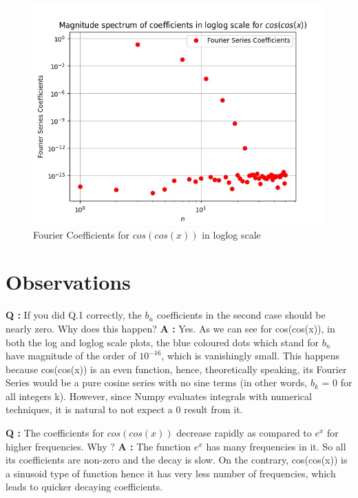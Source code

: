 \documentclass{article}
\begin{document}
\begin{figure}[!tbh]
    \centering
    \includegraphics[scale=0.65]{plots/Magnitude spectrum of coefficients in loglog scale for $cos(cos(x))$.jpg}
    \caption{Fourier Coefficients for $cos(cos(x))$ in loglog scale}
    \label{fig:Figure 6}
    \end{figure}

 
\hfill \break
\hfill \break

\section{Observations}
\textbf{Q :} If you did Q.1 correctly, the $b_n$ coefficients in the second case should be nearly zero. Why does this happen?\newline
\textbf{A :} Yes. As we can see for cos(cos(x)), in both the log and loglog scale plots, the blue coloured dots which stand for $b_n$ have magnitude of the order of $10^{-16}$, which is vanishingly small. This happens because cos(cos(x)) is an even function, hence, theoretically speaking, its Fourier Series would be a pure cosine series with no sine terms (in other words, $b_k$ = 0 for all integers k). However, since Numpy evaluates integrals with numerical techniques, it is natural to not expect a 0 result from it. \newline \newline

\noindent\textbf{Q :} The coefficients for $cos(cos(x))$ decrease rapidly as compared to $e^x$ for higher frequencies. Why ?\newline
\textbf{A :} The function $e^x$ has many frequencies in it. So all its coefficients are non-zero and the decay is slow. On the contrary, cos(cos(x)) is a sinusoid type of function hence it has very less number of frequencies, which leads to quicker decaying coefficients.
\newline\newline
\end{document}
